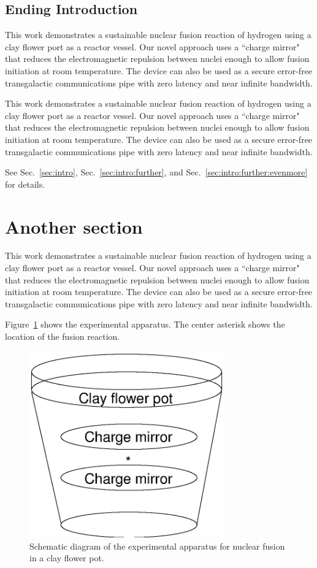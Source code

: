 \subsection{\label{sec:intro:ending}Ending Introduction}
This work demonstrates a sustainable nuclear fusion reaction of hydrogen 
using a clay flower port as a reactor vessel. Our novel approach uses
a ``charge mirror" that reduces the electromagnetic repulsion between 
nuclei enough to allow fusion initiation at room temperature.
The device can also be used as a secure error-free transgalactic communications
pipe with zero latency and near infinite bandwidth.   

This work demonstrates a sustainable nuclear fusion reaction of hydrogen 
using a clay flower port as a reactor vessel. Our novel approach uses
a ``charge mirror" that reduces the electromagnetic repulsion between 
nuclei enough to allow fusion initiation at room temperature.
The device can also be used as a secure error-free transgalactic communications
pipe with zero latency and near infinite bandwidth.   

See Sec.~\ref{sec:intro}, Sec.~\ref{sec:intro:further}, and 
Sec.~\ref{sec:intro:further:evenmore} for details.

\section{\label{sec:another}Another section}
This work demonstrates a sustainable nuclear fusion reaction of hydrogen 
using a clay flower port as a reactor vessel. Our novel approach uses
a ``charge mirror" that reduces the electromagnetic repulsion between 
nuclei enough to allow fusion initiation at room temperature.
The device can also be used as a secure error-free transgalactic communications
pipe with zero latency and near infinite bandwidth.   

Figure~\ref{fig:claypot} shows the experimental apparatus.
The center asterisk shows the location of the fusion reaction.

\begin{figure}
\begin{center}
\includegraphics*[width=3.3in]{images/figure}
\caption{\label{fig:claypot}
Schematic diagram of the experimental apparatus 
for nuclear fusion in a clay flower pot.}
\end{center}
\end{figure}

